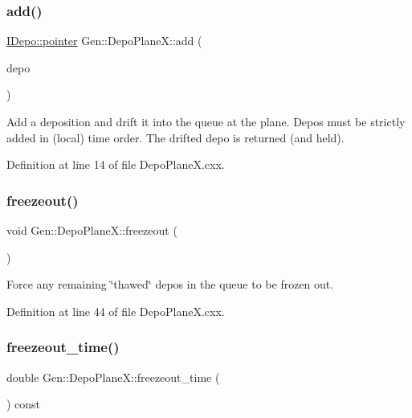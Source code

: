 \subsubsection{\texorpdfstring{add()}{add()}}
{\footnotesize\ttfamily \hyperlink{class_wire_cell_1_1_i_data_aff870b3ae8333cf9265941eef62498bc}{I\+Depo\+::pointer} Gen\+::\+Depo\+Plane\+X\+::add (\begin{DoxyParamCaption}\item[{const \hyperlink{class_wire_cell_1_1_i_data_aff870b3ae8333cf9265941eef62498bc}{I\+Depo\+::pointer} \&}]{depo }\end{DoxyParamCaption})}

Add a deposition and drift it into the queue at the plane. Depos must be strictly added in (local) time order. The drifted depo is returned (and held). 

Definition at line 14 of file Depo\+Plane\+X.\+cxx.

\mbox{\label{class_wire_cell_1_1_gen_1_1_depo_plane_x_a8390619e6c7ddc2c7a60140ea7339336}} 
\subsubsection{\texorpdfstring{freezeout()}{freezeout()}}
{\footnotesize\ttfamily void Gen\+::\+Depo\+Plane\+X\+::freezeout (\begin{DoxyParamCaption}{ }\end{DoxyParamCaption})}



Force any remaining \char`\"{}thawed\char`\"{} depos in the queue to be frozen out. 



Definition at line 44 of file Depo\+Plane\+X.\+cxx.

\mbox{\label{class_wire_cell_1_1_gen_1_1_depo_plane_x_a3a9d553d5ade20322d03cb7e175babc8}} 
\subsubsection{\texorpdfstring{freezeout\+\_\+time()}{freezeout\_time()}}
{\footnotesize\ttfamily double Gen\+::\+Depo\+Plane\+X\+::freezeout\+\_\+time (\begin{DoxyParamCaption}{ }\end{DoxyParamCaption}) const}

